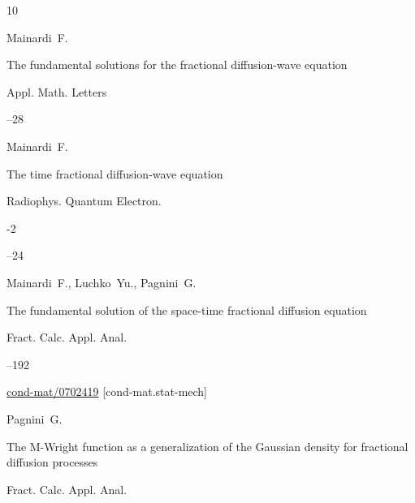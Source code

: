 \begin{thebibliography}{10}

\by Mainardi~F.

\paper The fundamental solutions for the fractional diffusion-wave equation

\jour Appl.  Math. Letters




--28





\by Mainardi~F.

\paper  The time fractional diffusion-wave equation

\jour Radiophys. Quantum Electron.



-2

--24





\by Mainardi~F., Luchko~Yu., Pagnini~G.

\paper The fundamental solution of the space-time fractional diffusion equation

\jour Fract. Calc. Appl. Anal.




--192

\arxiv  	\href{https://arxiv.org/abs/cond-mat/0702419}{cond-mat/0702419} [cond-mat.stat-mech]
















\by Pagnini~G.

\paper The M-Wright function as a generalization of the Gaussian density for fractional diffusion processes

\jour Fract. Calc. Appl. Anal.



\end{thebibliography}
